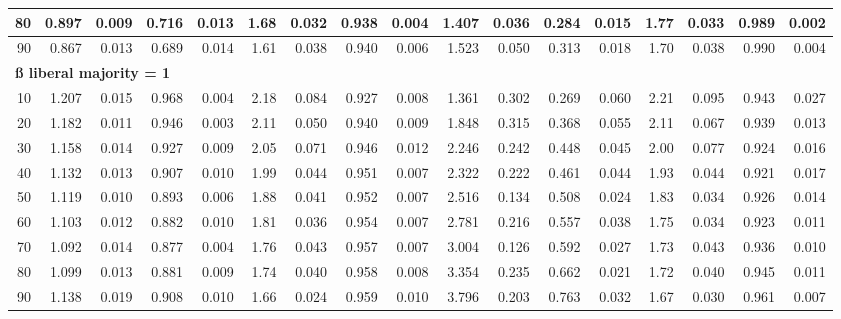 \documentclass[
]{article}
\begin{document}
\begin{table}[H]
\begin{table}
{\begin{tabular}{r|r|r|r|r|r|r|r|r|r|r|r|r|r|r|r|r}
\hline
\hspace{1em}80 & 0.897 & 0.009 & 0.716 & 0.013 & 1.68 & 0.032 & 0.938 & 0.004 & 1.407 & 0.036 & 0.284 & 0.015 & 1.77 & 0.033 & 0.989 & 0.002\\
\hline
\hspace{1em}90 & 0.867 & 0.013 & 0.689 & 0.014 & 1.61 & 0.038 & 0.940 & 0.006 & 1.523 & 0.050 & 0.313 & 0.018 & 1.70 & 0.038 & 0.990 & 0.004\\
\hline
\multicolumn{17}{l}{\textbf{ß liberal majority = 1}}\\
\hline
\hspace{1em}10 & 1.207 & 0.015 & 0.968 & 0.004 & 2.18 & 0.084 & 0.927 & 0.008 & 1.361 & 0.302 & 0.269 & 0.060 & 2.21 & 0.095 & 0.943 & 0.027\\
\hline
\hspace{1em}20 & 1.182 & 0.011 & 0.946 & 0.003 & 2.11 & 0.050 & 0.940 & 0.009 & 1.848 & 0.315 & 0.368 & 0.055 & 2.11 & 0.067 & 0.939 & 0.013\\
\hline
\hspace{1em}30 & 1.158 & 0.014 & 0.927 & 0.009 & 2.05 & 0.071 & 0.946 & 0.012 & 2.246 & 0.242 & 0.448 & 0.045 & 2.00 & 0.077 & 0.924 & 0.016\\
\hline
\hspace{1em}40 & 1.132 & 0.013 & 0.907 & 0.010 & 1.99 & 0.044 & 0.951 & 0.007 & 2.322 & 0.222 & 0.461 & 0.044 & 1.93 & 0.044 & 0.921 & 0.017\\
\hline
\hspace{1em}50 & 1.119 & 0.010 & 0.893 & 0.006 & 1.88 & 0.041 & 0.952 & 0.007 & 2.516 & 0.134 & 0.508 & 0.024 & 1.83 & 0.034 & 0.926 & 0.014\\
\hline
\hspace{1em}60 & 1.103 & 0.012 & 0.882 & 0.010 & 1.81 & 0.036 & 0.954 & 0.007 & 2.781 & 0.216 & 0.557 & 0.038 & 1.75 & 0.034 & 0.923 & 0.011\\
\hline
\hspace{1em}70 & 1.092 & 0.014 & 0.877 & 0.004 & 1.76 & 0.043 & 0.957 & 0.007 & 3.004 & 0.126 & 0.592 & 0.027 & 1.73 & 0.043 & 0.936 & 0.010\\
\hline
\hspace{1em}80 & 1.099 & 0.013 & 0.881 & 0.009 & 1.74 & 0.040 & 0.958 & 0.008 & 3.354 & 0.235 & 0.662 & 0.021 & 1.72 & 0.040 & 0.945 & 0.011\\
\hline
\hspace{1em}90 & 1.138 & 0.019 & 0.908 & 0.010 & 1.66 & 0.024 & 0.959 & 0.010 & 3.796 & 0.203 & 0.763 & 0.032 & 1.67 & 0.030 & 0.961 & 0.007\\

\end{tabular}}
\end{table}
\end{table}
\end{document}
